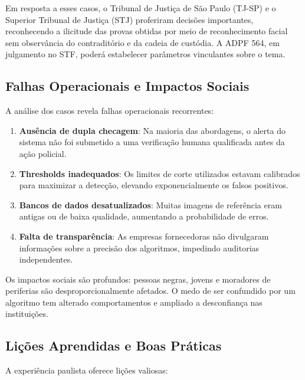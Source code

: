 \documentclass[12pt,a4paper]{article}
\begin{document}
Em resposta a esses casos, o Tribunal de Justiça de São Paulo (TJ-SP) e o Superior Tribunal de Justiça (STJ) proferiram decisões importantes, reconhecendo a ilicitude das provas obtidas por meio de reconhecimento facial sem observância do contraditório e da cadeia de custódia. A ADPF 564, em julgamento no STF, poderá estabelecer parâmetros vinculantes sobre o tema.

\subsection{Falhas Operacionais e Impactos Sociais}

A análise dos casos revela falhas operacionais recorrentes:

\begin{enumerate}
    \item \textbf{Ausência de dupla checagem}: Na maioria das abordagens, o alerta do sistema não foi submetido a uma verificação humana qualificada antes da ação policial.
    
    \item \textbf{Thresholds inadequados}: Os limites de corte utilizados estavam calibrados para maximizar a detecção, elevando exponencialmente os falsos positivos.
    
    \item \textbf{Bancos de dados desatualizados}: Muitas imagens de referência eram antigas ou de baixa qualidade, aumentando a probabilidade de erros.
    
    \item \textbf{Falta de transparência}: As empresas fornecedoras não divulgaram informações sobre a precisão dos algoritmos, impedindo auditorias independentes.
\end{enumerate}

Os impactos sociais são profundos: pessoas negras, jovens e moradores de periferias são desproporcionalmente afetados. O medo de ser confundido por um algoritmo tem alterado comportamentos e ampliado a desconfiança nas instituições.

\subsection{Lições Aprendidas e Boas Práticas}

A experiência paulista oferece lições valiosas:
\end{document}
